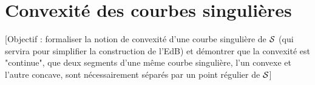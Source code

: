 \section{Convexité des courbes singulières}
\label{section:def_convexite_courbe_singuliere}
[Objectif : formaliser la notion de convexité d'une courbe singulière de $\mathcal{S}$ (qui servira pour simplifier la construction de l'EdB) et démontrer que la convexité est "continue", \ie que deux segments d'une même courbe singulière, l'un convexe et l'autre concave, sont nécessairement séparés par un point régulier de $\mathcal{S}$]
%



